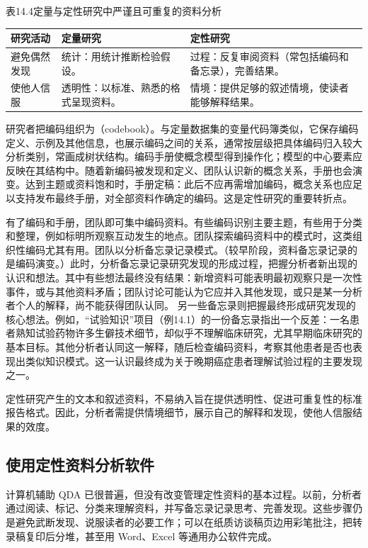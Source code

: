 \begin{bookbox}{表14.4\quad 定量与定性研究中严谨且可重复的资料分析}
\begin{tabularx}{\linewidth}{L{.17\linewidth}YY}\toprule
研究活动 & 定量研究 & 定性研究\\\midrule
避免偶然发现 & 统计：用统计推断检验假设。 & 过程：反复审阅资料（常包括编码和备忘录），完善结果。\\
使他人信服 & 透明性：以标准、熟悉的格式呈现资料。 & 情境：提供足够的叙述情境，使读者能够解释结果。\\\bottomrule
\end{tabularx}
\end{bookbox}

研究者把编码组织为（codebook）。与定量数据集的变量代码簿类似，它保存编码定义、示例及其他信息，也展示编码之间的关系，通常按层级把具体编码归入较大分析类别，常画成树状结构。编码手册使概念模型得到操作化；模型的中心要素应反映在其结构中。随着新编码被发现和定义、团队认识新的概念关系，手册也会演变。达到主题或资料饱和时，手册定稿：此后不应再需增加编码，概念关系也应足以支持发布最终手册，对全部资料作确定的编码。这是定性研究的重要转折点。

有了编码和手册，团队即可集中编码资料。有些编码识别主要主题，有些用于分类和整理，例如标明所观察互动发生的地点。团队探索编码资料中的模式时，这类组织性编码尤其有用。团队以分析备忘录记录模式。（较早阶段，资料备忘录记录的是编码演变。）此时，分析备忘录记录研究发现的形成过程，把握分析者新出现的认识和想法。其中有些想法最终没有结果：新增资料可能表明最初观察只是一次性事件，或与其他资料矛盾；团队讨论可能认为它应并入其他发现，或只是某一分析者个人的解释，尚不能获得团队认同。
另一些备忘录则把握最终形成研究发现的核心想法。例如，“试验知识”项目（例14.1）的一份备忘录指出一个反差：一名患者熟知试验药物许多生僻技术细节，却似乎不理解临床研究，尤其早期临床研究的基本目标。其他分析者认同这一解释，随后检查编码资料，考察其他患者是否也表现出类似知识模式。这一认识最终成为关于晚期癌症患者理解试验过程的主要发现之一。

定性研究产生的文本和叙述资料，不易纳入旨在提供透明性、促进可重复性的标准报告格式。因此，分析者需提供情境细节，展示自己的解释和发现，使他人信服结果的效度。

\subsection{使用定性资料分析软件}
计算机辅助 QDA 已很普遍，但没有改变管理定性资料的基本过程。以前，分析者通过阅读、标记、分类来理解资料，并写备忘录记录思考、完善发现。这些步骤仍是避免武断发现、说服读者的必要工作；可以在纸质访谈稿页边用彩笔批注，把转录稿复印后分堆，甚至用 Word、Excel 等通用办公软件完成。

